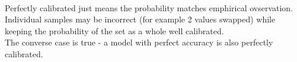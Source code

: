 \begin{answer}\\
Perfectly calibrated just means the probability matches emphirical ovservation. Individual samples may be incorrect (for example 2 values swapped) while keeping the probability of the set as a whole well calibrated.\\
The converse case is true - a model with perfect accuracy is also perfectly calibrated.
\end{answer}
